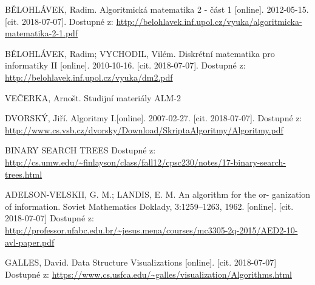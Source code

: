 \documentclass[
  biblatex=false,
  font=serif,
  glossaries=false,
  tables=false,
  theorems=false,
  index
]{kidiplom}
\begin{document}
\begin{thebibliography}{99}	

 \uppercase{BĚlohlávek}, Radim. Algoritmická matematika 2 - část 1 [online]. 2012-05-15. [cit. 2018-07-07]. Dostupné z: \url{http://belohlavek.inf.upol.cz/vyuka/algoritmicka-matematika-2-1.pdf}

 \uppercase{BĚlohlávek}, Radim; \uppercase{Vychodil}, Vilém. Diskrétní matematika pro informatiky II [online]. 2010-10-16. [cit. 2018-07-07]. Dostupné z: \url{http://belohlavek.inf.upol.cz/vyuka/dm2.pdf}

 \uppercase{veČerka}, Arnošt. Studijní materiály ALM-2

 \uppercase{DvorskÝ}, Jiří. Algoritmy I.[online]. 2007-02-27. [cit. 2018-07-07]. Dostupné z: \url{http://www.cs.vsb.cz/dvorsky/Download/SkriptaAlgoritmy/Algoritmy.pdf}

 \uppercase{Binary Search Trees}
Dostupné z: \url{http://cs.umw.edu/~finlayson/class/fall12/cpsc230/notes/17-binary-search-trees.html}

 \uppercase{Adelson-Velskii}, G. M.; \uppercase{Landis}, E. M. An algorithm for the or-
ganization of information. Soviet Mathematics Doklady, 3:1259–1263, 1962. [online]. [cit. 2018-07-07] Dostupné z: \url{http://professor.ufabc.edu.br/~jesus.mena/courses/mc3305-2q-2015/AED2-10-avl-paper.pdf}

 \uppercase{Galles}, David. Data Structure Visualizations [online]. [cit. 2018-07-07]
Dostupné z: \url{https://www.cs.usfca.edu/~galles/visualization/Algorithms.html}

\end{thebibliography}
%
%



\printindex
\end{document}
